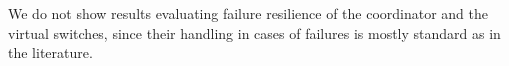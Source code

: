 We do not show results evaluating failure resilience of the coordinator and the virtual switches, since their handling in cases of failures is mostly standard as in the literature.




